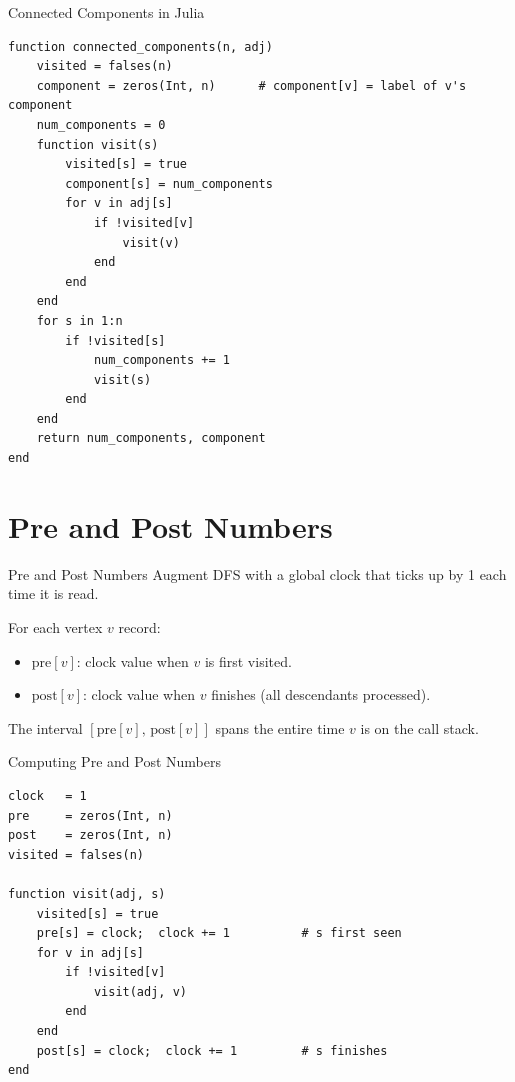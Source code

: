 \documentclass[10pt,aspectratio=169]{beamer}
\begin{document}
\begin{frame}[fragile]{Connected Components in Julia}
\begin{lstlisting}[basicstyle=\ttfamily\scriptsize]
function connected_components(n, adj)
    visited = falses(n)
    component = zeros(Int, n)      # component[v] = label of v's component
    num_components = 0
    function visit(s)
        visited[s] = true
        component[s] = num_components
        for v in adj[s]
            if !visited[v]
                visit(v)
            end
        end
    end
    for s in 1:n
        if !visited[s]
            num_components += 1
            visit(s)
        end
    end
    return num_components, component
end
\end{lstlisting}
\end{frame}

\section{Pre and Post Numbers}

\begin{frame}{Pre and Post Numbers}
  Augment DFS with a global \alert{clock} that ticks up by 1 each time it is read.

  \bigskip
  For each vertex $v$ record:
  \begin{itemize}
    \item $\mathrm{pre}[v]$: clock value when $v$ is \alert{first visited}.
    \item $\mathrm{post}[v]$: clock value when $v$ \alert{finishes} (all descendants processed).
  \end{itemize}

  \bigskip
  \begin{center}
    The interval $[\mathrm{pre}[v],\, \mathrm{post}[v]]$ spans the entire time $v$
    is on the call stack.
  \end{center}
\end{frame}

\begin{frame}[fragile]{Computing Pre and Post Numbers}
\begin{lstlisting}
clock   = 1
pre     = zeros(Int, n)
post    = zeros(Int, n)
visited = falses(n)

function visit(adj, s)
    visited[s] = true
    pre[s] = clock;  clock += 1          # s first seen
    for v in adj[s]
        if !visited[v]
            visit(adj, v)
        end
    end
    post[s] = clock;  clock += 1         # s finishes
end
\end{lstlisting}
\end{frame}
\end{document}
